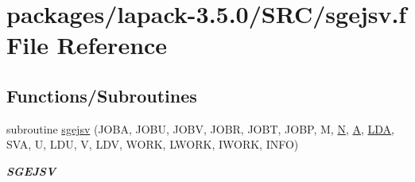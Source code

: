 \hypertarget{sgejsv_8f}{}\section{packages/lapack-\/3.5.0/\+S\+R\+C/sgejsv.f File Reference}
\label{sgejsv_8f}
\subsection*{Functions/\+Subroutines}
\begin{DoxyCompactItemize}
\item 
subroutine \hyperlink{group__realGEsing_ga4b629535d69b782d6421518962e639f1}{sgejsv} (J\+O\+B\+A, J\+O\+B\+U, J\+O\+B\+V, J\+O\+B\+R, J\+O\+B\+T, J\+O\+B\+P, M, \hyperlink{polmisc_8c_a0240ac851181b84ac374872dc5434ee4}{N}, \hyperlink{classA}{A}, \hyperlink{example__user_8c_ae946da542ce0db94dced19b2ecefd1aa}{L\+D\+A}, S\+V\+A, U, L\+D\+U, V, L\+D\+V, W\+O\+R\+K, L\+W\+O\+R\+K, I\+W\+O\+R\+K, I\+N\+F\+O)
\begin{DoxyCompactList}\small\item\em {\bfseries S\+G\+E\+J\+S\+V} \end{DoxyCompactList}\end{DoxyCompactItemize}
